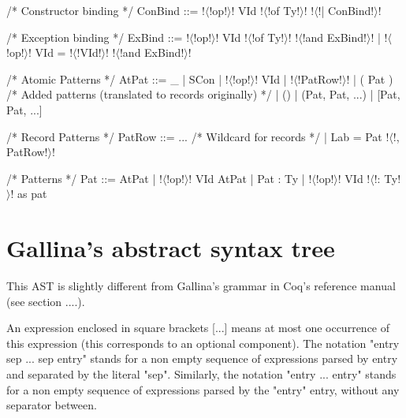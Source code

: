 \documentclass[a4paper,11pt]{article}
\begin{document}
\begin{grm}
/* Constructor binding */
ConBind ::= !$\langle$!op!$\rangle$! VId !$\langle$!of Ty!$\rangle$! !$\langle$!| ConBind!$\rangle$!

/* Exception binding */
ExBind ::= !$\langle$!op!$\rangle$! VId !$\langle$!of Ty!$\rangle$! !$\langle$!and ExBind!$\rangle$!
         | !$\langle$!op!$\rangle$! VId = !$\langle$!VId!$\rangle$! !$\langle$!and ExBind!$\rangle$!

/* Atomic Patterns */
AtPat ::= _ 
        | SCon
        | !$\langle$!op!$\rangle$! VId 
        | { !$\langle$!PatRow!$\rangle$! }
        | ( Pat )
        /* Added patterns (translated to records originally) */
        | ()
        | (Pat, Pat, ...)
        | [Pat, Pat, ...]

/* Record Patterns */
PatRow ::= ... /* Wildcard for records */
         | Lab = Pat !$\langle$!, PatRow!$\rangle$!

/* Patterns */
Pat ::= AtPat
      | !$\langle$!op!$\rangle$! VId AtPat
      | Pat : Ty
      | !$\langle$!op!$\rangle$! VId !$\langle$!: Ty!$\rangle$! as pat
\end{grm}

\section{Gallina's abstract syntax tree}

This AST is slightly different from Gallina's grammar in Coq's reference manual
(see section ....).

An expression enclosed in square brackets [...] means at
most one occurrence of this expression (this corresponds to an optional
component). The notation "entry sep ... sep entry" stands for a non empty sequence
of expressions parsed by entry and separated by the literal "sep". Similarly,
the notation "entry ... entry" stands for a non empty sequence of expressions
parsed by the "entry" entry, without any separator between.
\end{document}
